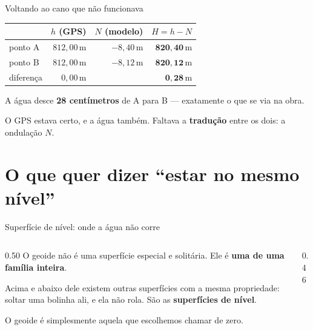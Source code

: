 \documentclass[aspectratio=169,11pt]{beamer}
\newcommand{\bnum}[1]{\textbf{\textcolor{mTeal}{#1}}}
\begin{document}
\begin{frame}{Voltando ao cano que não funcionava}
  \centering
  \small
  \renewcommand{\arraystretch}{1.35}
  \begin{tabular}{lrrr}
    \toprule
    & \textcolor{corElip}{$h$ (GPS)} & \textcolor{mRose}{$N$ (modelo)}
    & \textcolor{corGeoide}{$H = h - N$} \\
    \midrule
    ponto A & $812{,}00$\,m & $-8{,}40$\,m & \textcolor{corGeoide}{$\mathbf{820{,}40}$\,m} \\
    ponto B & $812{,}00$\,m & $-8{,}12$\,m & \textcolor{corGeoide}{$\mathbf{820{,}12}$\,m} \\
    \midrule
    diferença & $0{,}00$\,m & & \alert{$\mathbf{0{,}28}$\,m} \\
    \bottomrule
  \end{tabular}
  \bigskip

  A água desce \bnum{28 centímetros} de A para B --- exatamente o que se via na obra.
  \medskip

  \begin{ideia}[title={O que o geoide resolveu}]
    O GPS estava certo, e a água também. Faltava a \bnum{tradução} entre os dois:
    a ondulação $N$.
  \end{ideia}
\end{frame}

\section{O que quer dizer ``estar no mesmo nível''}

\begin{frame}{Superfície de nível: onde a água não corre}
  \begin{columns}[T]
    \begin{column}{0.50\textwidth}
      O geoide não é uma superfície especial e solitária. Ele é \bnum{uma de uma família
      inteira}.
      \medskip

      Acima e abaixo dele existem outras superfícies com a mesma propriedade: soltar uma
      bolinha ali, e ela não rola. São as \bnum{superfícies de nível}.
      \medskip

      O geoide é simplesmente aquela que escolhemos chamar de \alert{zero}.
    \end{column}
    \begin{column}{0.46\textwidth}
      \centering
    \end{column}
  \end{columns}
\end{frame}
\end{document}
